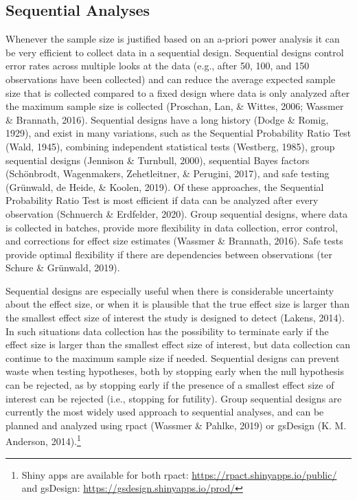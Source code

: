 \documentclass[
  english,
  ,jou,floatsintext]{apa6}
\begin{document}
\hypertarget{sequential-analyses}{%
\subsection{Sequential Analyses}\label{sequential-analyses}}

Whenever the sample size is justified based on an a-priori power analysis it can be very efficient to collect data in a sequential design. Sequential designs control error rates across multiple looks at the data (e.g., after 50, 100, and 150 observations have been collected) and can reduce the average expected sample size that is collected compared to a fixed design where data is only analyzed after the maximum sample size is collected (Proschan, Lan, \& Wittes, 2006; Wassmer \& Brannath, 2016). Sequential designs have a long history (Dodge \& Romig, 1929), and exist in many variations, such as the Sequential Probability Ratio Test (Wald, 1945), combining independent statistical tests (Westberg, 1985), group sequential designs (Jennison \& Turnbull, 2000), sequential Bayes factors (Schönbrodt, Wagenmakers, Zehetleitner, \& Perugini, 2017), and safe testing (Grünwald, de Heide, \& Koolen, 2019). Of these approaches, the Sequential Probability Ratio Test is most efficient if data can be analyzed after every observation (Schnuerch \& Erdfelder, 2020). Group sequential designs, where data is collected in batches, provide more flexibility in data collection, error control, and corrections for effect size estimates (Wassmer \& Brannath, 2016). Safe tests provide optimal flexibility if there are dependencies between observations (ter Schure \& Grünwald, 2019).

Sequential designs are especially useful when there is considerable uncertainty about the effect size, or when it is plausible that the true effect size is larger than the smallest effect size of interest the study is designed to detect (Lakens, 2014). In such situations data collection has the possibility to terminate early if the effect size is larger than the smallest effect size of interest, but data collection can continue to the maximum sample size if needed. Sequential designs can prevent waste when testing hypotheses, both by stopping early when the null hypothesis can be rejected, as by stopping early if the presence of a smallest effect size of interest can be rejected (i.e., stopping for futility). Group sequential designs are currently the most widely used approach to sequential analyses, and can be planned and analyzed using rpact (Wassmer \& Pahlke, 2019) or gsDesign (K. M. Anderson, 2014).\footnote{Shiny apps are available for both rpact: \url{https://rpact.shinyapps.io/public/} and gsDesign: \url{https://gsdesign.shinyapps.io/prod/}}
\end{document}
